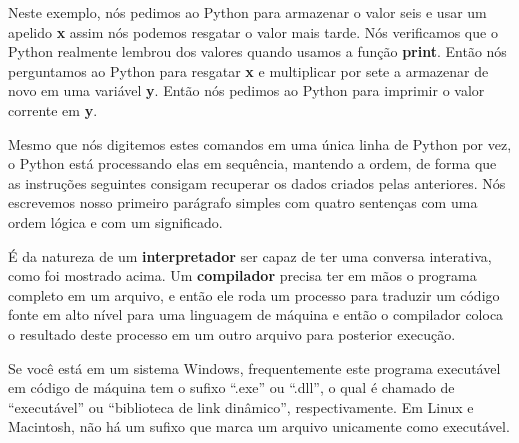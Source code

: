 Neste exemplo, nós pedimos ao Python para armazenar o valor seis e usar um apelido {\bf x}
assim nós podemos resgatar o valor mais tarde. Nós verificamos que o Python realmente
lembrou dos valores quando usamos a função {\bf print}. Então nós perguntamos ao Python
para resgatar {\bf x} e multiplicar por sete a armazenar de novo em uma variável {\bf y}.
Então nós pedimos ao Python para imprimir o valor corrente em {\bf y}.
%

Mesmo que nós digitemos estes comandos em uma única linha de Python por vez, o Python
está processando elas em sequência, mantendo a ordem, de forma que as
instruções seguintes consigam recuperar os dados criados pelas anteriores. Nós escrevemos
nosso primeiro parágrafo simples com quatro sentenças com uma ordem lógica e com um
significado.
%

É da natureza de um {\bf interpretador} ser capaz de ter uma conversa interativa, como 
foi mostrado acima. Um {\bf compilador} precisa ter em mãos o programa completo em um arquivo,
e então ele roda um processo para traduzir um código fonte em alto nível para uma linguagem
de máquina e então o compilador coloca o resultado deste processo em um outro arquivo
para posterior execução.
%

Se você está em um sistema Windows, frequentemente este programa executável em código
de máquina tem o sufixo ``.exe'' ou ``.dll'', o qual é chamado de ``executável'' ou 
``biblioteca de link dinâmico'', respectivamente. Em Linux e Macintosh, não há um sufixo
que marca um arquivo unicamente como executável.
%

